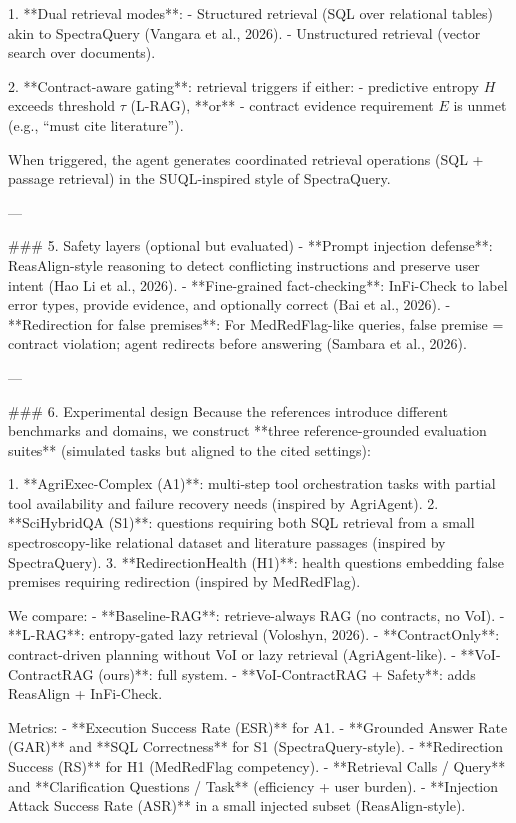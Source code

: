 1. **Dual retrieval modes**:  
   - Structured retrieval (SQL over relational tables) akin to SpectraQuery (Vangara et al., 2026).  
   - Unstructured retrieval (vector search over documents).

2. **Contract-aware gating**: retrieval triggers if either:
   - predictive entropy \(H\) exceeds threshold \(\tau\) (L-RAG), **or**
   - contract evidence requirement \(E\) is unmet (e.g., “must cite literature”).

When triggered, the agent generates coordinated retrieval operations (SQL + passage retrieval) in the SUQL-inspired style of SpectraQuery.

---

### 5. Safety layers (optional but evaluated)
- **Prompt injection defense**: ReasAlign-style reasoning to detect conflicting instructions and preserve user intent (Hao Li et al., 2026).
- **Fine-grained fact-checking**: InFi-Check to label error types, provide evidence, and optionally correct (Bai et al., 2026).
- **Redirection for false premises**: For MedRedFlag-like queries, false premise = contract violation; agent redirects before answering (Sambara et al., 2026).

---

### 6. Experimental design
Because the references introduce different benchmarks and domains, we construct **three reference-grounded evaluation suites** (simulated tasks but aligned to the cited settings):

1. **AgriExec-Complex (A1)**: multi-step tool orchestration tasks with partial tool availability and failure recovery needs (inspired by AgriAgent).  
2. **SciHybridQA (S1)**: questions requiring both SQL retrieval from a small spectroscopy-like relational dataset and literature passages (inspired by SpectraQuery).  
3. **RedirectionHealth (H1)**: health questions embedding false premises requiring redirection (inspired by MedRedFlag).

We compare:
- **Baseline-RAG**: retrieve-always RAG (no contracts, no VoI).  
- **L-RAG**: entropy-gated lazy retrieval (Voloshyn, 2026).  
- **ContractOnly**: contract-driven planning without VoI or lazy retrieval (AgriAgent-like).  
- **VoI-ContractRAG (ours)**: full system.  
- **VoI-ContractRAG + Safety**: adds ReasAlign + InFi-Check.

Metrics:
- **Execution Success Rate (ESR)** for A1.
- **Grounded Answer Rate (GAR)** and **SQL Correctness** for S1 (SpectraQuery-style).
- **Redirection Success (RS)** for H1 (MedRedFlag competency).
- **Retrieval Calls / Query** and **Clarification Questions / Task** (efficiency + user burden).
- **Injection Attack Success Rate (ASR)** in a small injected subset (ReasAlign-style).

